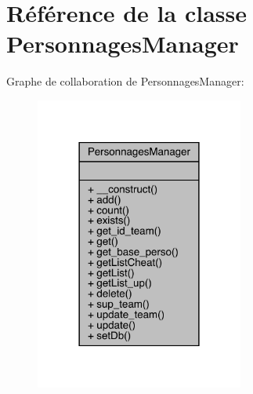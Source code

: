 \hypertarget{class_personnages_manager}{}\section{Référence de la classe Personnages\+Manager}
\label{class_personnages_manager}


Graphe de collaboration de Personnages\+Manager\+:\nopagebreak
\begin{figure}[H]
\begin{center}
\leavevmode
\includegraphics[width=194pt]{class_personnages_manager__coll__graph}
\end{center}
\end{figure}
